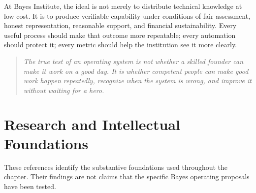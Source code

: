 At Bayes Institute, the ideal is not merely to distribute technical knowledge at low cost. It is to produce verifiable capability under conditions of fair assessment, honest representation, reasonable support, and financial sustainability. Every useful process should make that outcome more repeatable; every automation should protect it; every metric should help the institution see it more clearly.

\begin{quote}
\textit{The true test of an operating system is not whether a skilled founder can make it work on a good day. It is whether competent people can make good work happen repeatedly, recognize when the system is wrong, and improve it without waiting for a hero.}
\end{quote}

\section*{Research and Intellectual Foundations}

These references identify the substantive foundations used throughout the chapter. Their findings are not claims that the specific Bayes operating proposals have been tested.

